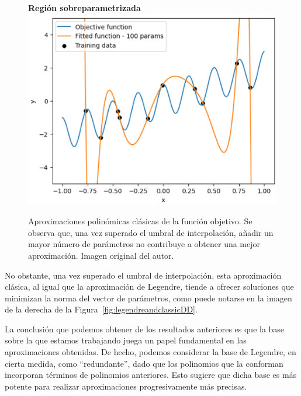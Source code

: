 \begin{figure}[h]
    \begin{minipage}{0.32\textwidth}
        \centering
        \textbf{Región sobreparametrizada} \\[0.5ex] 
        \includegraphics[width=\linewidth]{img/experiments/OLS1.3.png}
    \end{minipage}
    \caption[Aproximaciones polinómicas clásicas de la función objetivo.]{Aproximaciones polinómicas clásicas de la función objetivo. Se observa que, una vez superado el umbral de interpolación, añadir un mayor número de parámetros no contribuye a obtener una mejor aproximación. Imagen original del autor.}\label{fig:polynomial1DD}
\end{figure}

No obstante, una vez superado el umbral de interpolación, esta aproximación clásica, al igual que la aproximación de Legendre, tiende a ofrecer soluciones que minimizan la norma del vector de parámetros, como puede notarse en la imagen de la derecha de la Figura~\ref{fig:legendreandclassicDD}.\newline

La conclusión que podemos obtener de los resultados anteriores es que la base sobre la que estamos trabajando juega un papel fundamental en las aproximaciones obtenidas. De hecho, podemos considerar la base de Legendre, en cierta medida, como ``redundante'', dado que los polinomios que la conforman incorporan términos de polinomios anteriores. Esto sugiere que dicha base es más potente para realizar aproximaciones progresivamente más precisas.\newline

